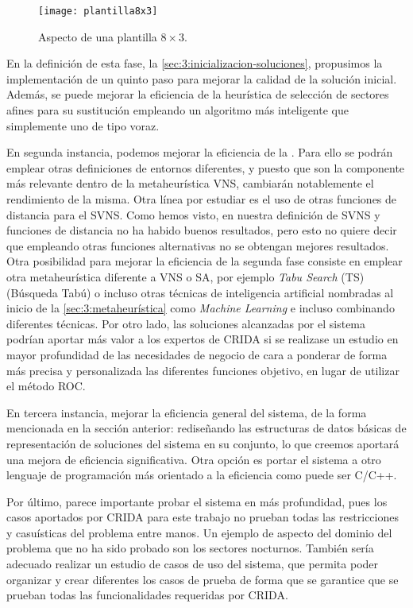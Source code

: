 \begin{figure}
	\centering
	\texttt{[image: plantilla8x3]}
	\caption{Aspecto de una plantilla $8\times3$.}
	\label{fig:6:plantilla8x3}
\end{figure}

En la definición de esta fase, la \autoref{sec:3:inicializacion-soluciones}, propusimos la implementación de un quinto paso para mejorar la calidad de la solución inicial. 
Además, se puede mejorar la eficiencia de la heurística de selección de sectores afines para su sustitución empleando un algoritmo más inteligente que simplemente uno de tipo voraz.

En segunda instancia, podemos mejorar la eficiencia de la \fasedos{}. Para ello se podrán emplear otras definiciones de entornos diferentes, y puesto que son la componente más relevante dentro de la metaheurística VNS, cambiarán notablemente el rendimiento de la misma. 
Otra línea por estudiar es el uso de otras funciones de distancia para el SVNS. Como hemos visto, en nuestra definición de SVNS y funciones de distancia no ha habido buenos resultados, pero esto no quiere decir que empleando otras funciones alternativas no se obtengan mejores resultados. Otra posibilidad para mejorar la eficiencia de la segunda fase consiste en emplear otra metaheurística diferente a VNS o SA, por ejemplo \textit{Tabu Search} (TS) (Búsqueda Tabú) o incluso otras técnicas de inteligencia artificial nombradas al inicio de la \autoref{sec:3:metaheurística} como \textit{Machine Learning} e incluso combinando diferentes técnicas.
Por otro lado, las soluciones alcanzadas por el sistema podrían aportar más valor a los expertos de CRIDA si se realizase un estudio en mayor profundidad de las necesidades de negocio de cara a ponderar de forma más precisa y personalizada las diferentes funciones objetivo, en lugar de utilizar el método ROC.

En tercera instancia, mejorar la eficiencia general del sistema, de la forma mencionada en la sección anterior: rediseñando las estructuras de datos básicas de representación de soluciones del sistema en su conjunto, lo que creemos aportará una mejora de eficiencia significativa. Otra opción es portar el sistema a otro lenguaje de programación más orientado a la eficiencia como puede ser C/C++. 

Por último, parece importante probar el sistema en más profundidad, pues los casos aportados por CRIDA para este trabajo no prueban todas las restricciones y casuísticas del problema entre manos. Un ejemplo de aspecto del dominio del problema que no ha sido probado son los sectores nocturnos. También sería adecuado realizar un estudio de casos de uso del sistema, que permita poder organizar y crear diferentes los casos de prueba de forma que se garantice que se prueban todas las funcionalidades requeridas por CRIDA.
